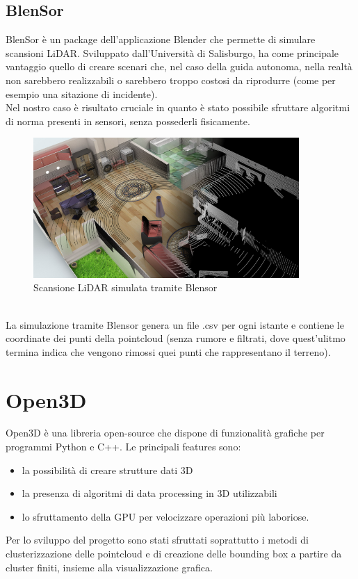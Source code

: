 \documentclass[italian]{report}
\begin{document}
\subsection{BlenSor}
BlenSor è un package dell'applicazione Blender che permette di simulare scansioni LiDAR. Sviluppato dall'Università di Salisburgo, ha come principale vantaggio quello di creare scenari che, nel caso della guida autonoma, nella realtà non sarebbero realizzabili o sarebbero troppo costosi da riprodurre (come per esempio una sitazione di incidente).\\
Nel nostro caso è risultato cruciale in quanto è stato possibile sfruttare algoritmi di norma presenti in sensori, senza possederli fisicamente.\\
\begin{figure}[H]
	\centering
	\includegraphics[width=0.9\textwidth]{Blensor}
	\footnotesize
	\caption{Scansione LiDAR simulata tramite Blensor}
\end{figure}\\
La simulazione tramite Blensor genera un file .csv per ogni istante e contiene le coordinate dei punti della pointcloud (senza rumore e filtrati, dove quest'ulitmo termina indica che vengono rimossi quei punti che rappresentano il terreno).
\section{Open3D}
Open3D è una libreria open-source che dispone di funzionalità grafiche per programmi Python e C++. Le principali features sono:
\begin{itemize}
	\item la possibilità di creare strutture dati 3D
	\item la presenza di algoritmi di data processing in 3D utilizzabili 
	\item lo sfruttamento della GPU per velocizzare operazioni più laboriose.
\end{itemize}
Per lo sviluppo del progetto sono stati sfruttati soprattutto i metodi di clusterizzazione delle pointcloud e di creazione delle bounding box a partire da cluster finiti, insieme alla visualizzazione grafica.
\end{document}
